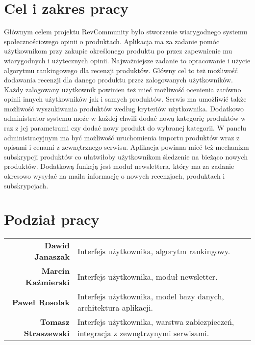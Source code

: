 \section{Cel i zakres pracy}

Głównym celem projektu RevCommunity było stworzenie wiarygodnego systemu społecznościowego opinii o produktach. Aplikacja ma za zadanie pomóc użytkownikom przy zakupie określonego produktu po przez zapewnienie mu wiarygodnych i użytecznych opinii. Najważniejsze zadanie to opracowanie i użycie algorytmu rankingowego dla recenzji produktów. Główny cel to też możliwość dodawania recenzji dla danego produktu przez zalogowanych użytkowników. Każdy zalogowany użytkownik powinien też mieć możliwość ocenienia zarówno opinii innych użytkowników jak i samych produktów. Serwis ma umożliwić także możliwość wyszukiwania produktów według kryteriów użytkownika. Dodatkowo administrator systemu może w każdej chwili dodać nową kategorię produktów w raz z jej parametrami czy dodać nowy produkt do wybranej kategorii. W panelu administracyjnym ma być możliwość uruchomienia importu produktów wraz z opisami i cenami z zewnętrznego serwisu. Aplikacja powinna mieć też mechanizm subskrypcji produktów co ułatwiłoby użytkownikom śledzenie na bieżąco nowych produktów. Dodatkową funkcją jest moduł newslettera, który ma za zadanie okresowo wysyłać na maila informację o nowych recenzjach, produktach i subskrypcjach. 



\section{Podział pracy}
\noindent\begin{tabular}{rp{9cm}}
\textbf{Dawid Janaszak} & Interfejs użytkownika, algorytm rankingowy.\\

\textbf{Marcin Kaźmierski} & Interfejs użytkownika, moduł newsletter.\\

\textbf{Paweł Rosolak} & Interfejs użytkownika, model bazy danych, architektura aplikacji.\\

\textbf{Tomasz Straszewski} & Interfejs użytkownika, warstwa zabiezpieczeń, integracja z zewnętrzynymi serwisami.\\
\end{tabular}

